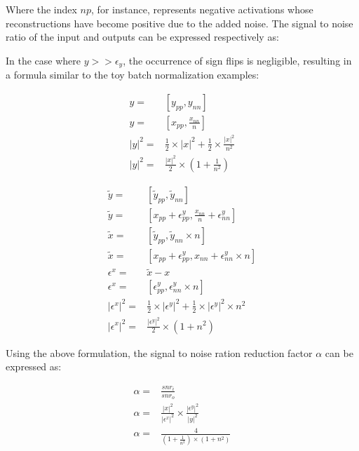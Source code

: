 \documentclass[twocolumn]{bmcart}
\begin{document}
Where the index $np$, for instance, represents negative activations whose reconstructions have become positive due to the added noise. 
The signal to noise ratio of the input and outputs can be expressed respectively as:

In the case where $y >> \epsilon_y$, the occurrence of sign flips is negligible,
resulting in a formula similar to the toy batch normalization examples:

\begin{subequations}
\begin{align}
 y =& [y_{pp}, y_{nn}] \\
 y =& [x_{pp}, \frac{x_{nn}}{n}] \\
 |y|^2 =& \frac{1}{2} \times |x|^2 + \frac{1}{2} \times \frac{|x|^2}{n^2} \\
 |y|^2 =&\frac{|x|^2}{2} \times (1+\frac{1}{n^2})
\end{align}
\end{subequations}

\begin{subequations}
\begin{align}
\tilde{y}       =& [ \tilde{y}_{pp}, \tilde{y}_{nn}] \\
\tilde{y}       =& [ x_{pp} + \epsilon_{pp}^y, \frac{x_{nn}}{n} + \epsilon_{nn}^y ] \\
\tilde{x}       =& [ \tilde{y}_{pp}, \tilde{y}_{nn} \times n] \\
\tilde{x}       =& [ x_{pp} + \epsilon_{pp}^y, x_{nn} + \epsilon_{nn}^y \times n  ]\\
\epsilon^x      =& \tilde{x} - x\\
\epsilon^x      =& [ \epsilon_{pp}^y, \epsilon_{nn}^y \times n ]\\
|\epsilon^x|^2  =& \frac{1}{2} \times |\epsilon^y|^2 + \frac{1}{2} \times |\epsilon^y|^2 \times n^2 \\
|\epsilon^x|^2  =& \frac{|\epsilon^y|^2}{2} \times (1 + n^2)
\end{align}
\end{subequations}

Using the above formulation, the signal to noise ration reduction factor $\alpha$ can be expressed as:

\begin{subequations}
\begin{align}
\alpha =& \frac{snr_i}{snr_o} \\
\alpha =& \frac{|x|^2}{|\epsilon^x|^2} \times  \frac{|\epsilon^y|^2}{|y|^2} \\
\alpha =& \frac{4}{(1+\frac{1}{n^2}) \times (1 + n^2)}
\end{align}
\end{subequations}
\end{document}
